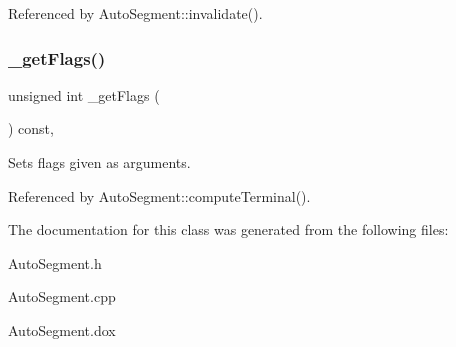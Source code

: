 Referenced by Auto\+Segment\+::invalidate().

\mbox{\label{classKatabatic_1_1AutoSegment_ae5b4a4f67d480cd5c9ce104e73e73da9}} 
\subsubsection{\texorpdfstring{\+\_\+get\+Flags()}{\_getFlags()}}
{\footnotesize\ttfamily unsigned int \+\_\+get\+Flags (\begin{DoxyParamCaption}{ }\end{DoxyParamCaption}) const\hspace{0.3cm}{\ttfamily [inline]}, {\ttfamily [protected]}}

Sets {\ttfamily flags} given as arguments. 

Referenced by Auto\+Segment\+::compute\+Terminal().



The documentation for this class was generated from the following files\+:\begin{DoxyCompactItemize}
\item 
Auto\+Segment.\+h\item 
Auto\+Segment.\+cpp\item 
Auto\+Segment.\+dox\end{DoxyCompactItemize}
